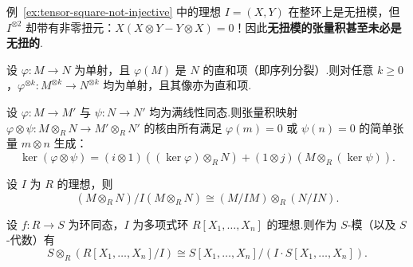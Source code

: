\begin{remark}\label{rem:torsion-free-tensor-torsion}
例~\ref{ex:tensor-square-not-injective} 中的理想 $I = (X, Y)$ 在整环上是无扭模，但 $I^{\otimes 2}$ 却带有非零扭元：$X(X \otimes Y - Y \otimes X) = 0$！因此\textbf{无扭模的张量积甚至未必是无扭的}.
\end{remark}

\begin{theorem}\label{thm:direct-summand-injective}
设 $\varphi \colon M \to N$ 为单射，且 $\varphi(M)$ 是 $N$ 的直和项（即序列分裂）.则对任意 $k \geq 0$，$\varphi^{\otimes k} \colon M^{\otimes k} \to N^{\otimes k}$ 均为单射，且其像亦为直和项.
\end{theorem}

\begin{theorem}[满同态张量积的核]\label{thm:kernel-surjective-tensor}
设 $\varphi \colon M \to M'$ 与 $\psi \colon N \to N'$ 均为满线性同态.则张量积映射 $\varphi \otimes \psi \colon M \otimes_R N \to M' \otimes_R N'$ 的核由所有满足 $\varphi(m) = 0$ 或 $\psi(n) = 0$ 的简单张量 $m \otimes n$ 生成：
\[
  \ker(\varphi \otimes \psi) = (i \otimes 1)((\ker \varphi) \otimes_R N) + (1 \otimes j)(M \otimes_R (\ker \psi)).
\]
\end{theorem}

\begin{corollary}\label{cor:quotient-ideal-tensor}
设 $I$ 为 $R$ 的理想，则
\[
  (M \otimes_R N) / I(M \otimes_R N) \cong (M/IM) \otimes_R (N/IN).
\]
\end{corollary}

\begin{corollary}\label{cor:poly-quotient-base-ext}
设 $f \colon R \to S$ 为环同态，$I$ 为多项式环 $R[X_1, \dots, X_n]$ 的理想.则作为 $S$-模（以及 $S$-代数）有
\[
  S \otimes_R \left(R[X_1, \dots, X_n] / I\right) \cong S[X_1, \dots, X_n] / (I \cdot S[X_1, \dots, X_n]).
\]
\end{corollary}
